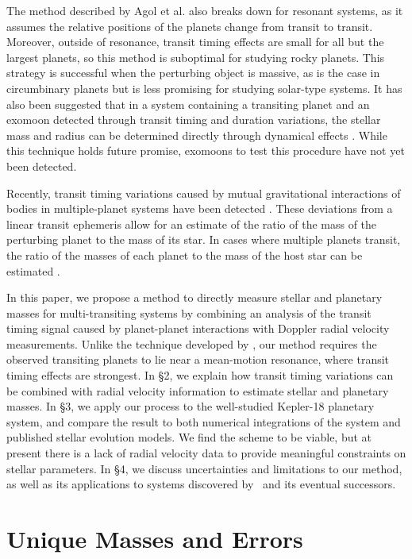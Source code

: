The method described by Agol et al. also breaks down for resonant systems, as it assumes the relative positions of the planets change from transit to transit. Moreover, outside of resonance, transit timing effects are small for all but the largest planets, so this method is suboptimal for studying rocky planets. This strategy is successful when the perturbing object is massive, as is the case in circumbinary planets \citep{Doyle11, Welsh12} but is less promising for studying solar-type systems. It has also been suggested that in a system containing a transiting planet and an exomoon detected through transit timing and duration variations, the stellar mass and radius can be determined directly through dynamical effects \citep{Kipping10}. While this technique holds future promise, exomoons to test this procedure have not yet been detected.

Recently, transit timing variations caused by mutual gravitational interactions of bodies in multiple-planet systems have been detected \citep{Holman10, Ford12TTV}. These deviations from a linear transit ephemeris allow for an estimate of the ratio of the mass of the perturbing planet to the mass of its star. In cases where multiple planets transit, the ratio of the masses of each planet to the mass of the host star can be estimated \citep{Fabrycky12, Steffen12a}.

In this paper, we propose a method to directly measure stellar and planetary masses for multi-transiting systems by combining an analysis of the transit timing signal caused by planet-planet interactions with Doppler radial velocity measurements. Unlike the technique developed by \citet{Agol05}, our method requires the observed transiting planets to lie near a mean-motion resonance, where transit timing effects are strongest. In \S2, we explain how transit timing variations can be combined with radial velocity information to estimate stellar and planetary masses. In \S3, we apply our process to the well-studied Kepler-18 planetary system, and compare the result to both numerical integrations of the system and published stellar evolution models. We find the scheme to be viable, but at present there is a lack of radial velocity data to provide meaningful constraints on stellar parameters. In \S4, we discuss uncertainties and limitations to our method, as well as its applications to systems discovered by \kep\ and its eventual successors.


\section{Unique Masses and Errors}

